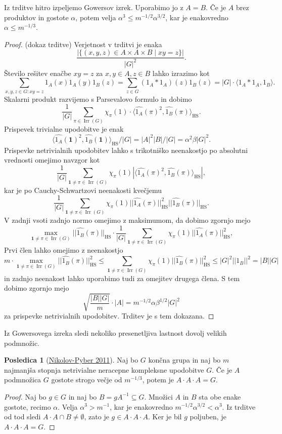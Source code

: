 \documentclass[11pt]{book}
\def\oneone{\mathbf{1}}
\DeclareMathOperator\Irr{Irr}
\DeclareMathOperator\HS{HS}
\theoremstyle{definition}
\theoremstyle{zgled}
\theoremstyle{zgledbrezstevilke}
\theoremstyle{odprtproblem}
\theoremstyle{domacanaloga}
\newenvironment{dokaz}
    {\color{siva}\begin{proof}}
    {\end{proof}}
\theoremstyle{izrek}
\newtheorem{posledica}[theorem]{Posledica}
\begin{document}
Iz trditve hitro izpeljemo Gowersov izrek. Uporabimo jo z $A=B$. Če je $A$ brez produktov in gostote $\alpha$, potem velja $\alpha^3 \leq m^{-1/2} \alpha^{3/2}$, kar je enakovredno $\alpha \leq m^{-1/3}$.


\begin{dokaz}(dokaz trditve)
Verjetnost v trditvi je enaka 
\[
    \frac{|\{ (x,y,z) \in A \times A \times B \mid xy = z \}|}{|G|^2}.
\]
Število rešitev enačbe $xy = z$ za $x,y \in A, z \in B$ lahko izrazimo kot
\[
    \sum_{x,y,z \in G \colon xy = z} 1_A(x) 1_A(y) 1_B(z)
    = \sum_{z \in G} (1_A * 1_A)(z) 1_B(z)
    = |G| \cdot \langle 1_A * 1_A, 1_B \rangle.
\]
Skalarni produkt razvijemo s Parsevalovo formulo in dobimo
\[
    \frac{1}{|G|} \sum_{\pi \in \Irr(G)} \chi_{\pi}(1) \cdot \langle \widehat{1_A}(\pi)^2, \widehat{1_B}(\pi) \rangle_{\HS}.
\]
Prispevek trivialne upodobitve je enak
\[
    \langle \widehat{1_A}(\oneone)^2, \widehat{1_B}(\oneone) \rangle_{\HS}/|G| = |A|^2 |B| / |G| = \alpha^2 \beta |G|^2. 
\]
Prispevke netrivialnih upodobitev lahko s trikotniško neenakostjo po absolutni vrednosti omejimo navzgor kot
\[
    \frac{1}{|G|} \sum_{\oneone \neq \pi \in \Irr(G)} \chi_{\pi}(1) \left| \langle \widehat{1_A}(\pi)^2, \widehat{1_B}(\pi) \rangle_{\HS} \right|,
\]
kar je po Cauchy-Schwartzovi neenakosti kvečjemu
\[
    \frac{1}{|G|} \sum_{\oneone \neq \pi \in \Irr(G)} \chi_{\pi}(1) || \widehat{1_A}(\pi) ||_{\HS}^2 || \widehat{1_B}(\pi) ||_{\HS}.
\]
V zadnji vsoti zadnjo normo omejimo z maksimumom, da dobimo zgornjo mejo
\[
    \max_{\oneone \neq \pi \in \Irr(G)} || \widehat{1_B}(\pi) ||_{\HS} \cdot 
    \frac{1}{|G|} \sum_{\oneone \neq \pi \in \Irr(G)} \chi_{\pi}(1) || \widehat{1_A}(\pi) ||_{\HS}^2,
\]
Prvi člen lahko omejimo z neenakostjo
\[
    m \cdot \max_{\oneone \neq \pi \in \Irr(G)} || \widehat{1_B}(\pi) ||^2_{\HS}
    \leq \sum_{\oneone \neq \pi \in \Irr(G)} \chi_{\pi}(1) ||\widehat{1_B}(\pi)||_{\HS}^2 
    \leq |G|^2 ||1_B||^2 = |B||G|
\]
in zadnjo neenakost lahko uporabimo tudi za omejitev drugega člena. S tem dobimo zgornjo mejo
\[
  \sqrt{\frac{|B||G|}{m}} \cdot |A| = m^{-1/2} \alpha \beta^{1/2} |G|^2
\]
za prispevke netrivialnih upodobitev. Trditev je s tem dokazana.
\end{dokaz}

Iz Gowersovega izreka sledi nekoliko presenetljiva lastnost dovolj velikih podmnožic.

\begin{posledica}[\href{https://eudml.org/doc/277468}{Nikolov-Pyber 2011}]
Naj bo $G$ končna grupa in naj bo $m$ najmanjša stopnja netrivialne neracepne kompleksne upodobitve $G$. Če je $A$ podmnožica $G$ gostote strogo večje od $m^{-1/3}$, potem je $A \cdot A \cdot A = G$.
\end{posledica}
\begin{dokaz}
Naj bo $g \in G$ in naj bo $B = g A^{-1} \subseteq G$. Množici $A$ in $B$ sta obe enake gostote, recimo $\alpha$. Velja $\alpha^3 > m^{-1}$, kar je enakovredno $m^{-1/2} \alpha^{3/2} < \alpha^3$. Iz trditve od tod sledi $A \cdot A \cap B \neq \emptyset$, zato je $g \in A \cdot A \cdot A$. Ker je bil $g$ poljuben, je $A \cdot A \cdot A = G$.
\end{dokaz}
\end{document}
